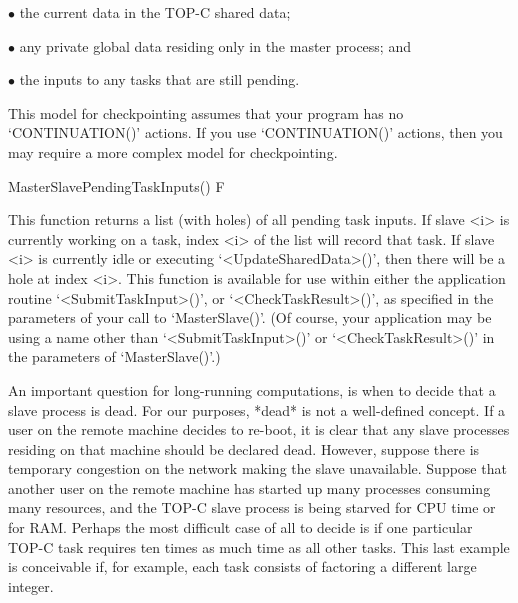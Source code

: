 \beginlist%

\item{$\bullet$}
    the current data in the TOP-C shared data;

\item{$\bullet$}
    any private global data residing only in the master process; and

\item{$\bullet$}
    the inputs to any tasks that are still pending.

\endlist

This  model  for  checkpointing  assumes  that  your   program   has   no
`CONTINUATION()' actions. If you use `CONTINUATION()' actions,  then  you
may require a more complex model for checkpointing.

\>MasterSlavePendingTaskInputs() F

This function returns a {\GAP} list (with  holes)  of  all  pending  task
inputs. If slave <i> is currently working on a task,  index  <i>  of  the
list will record that task. If slave <i> is currently idle  or  executing
`<UpdateSharedData>()', then there will be a hole  at  index  <i>.  This
function is available for  use  within  either  the  application  routine
`<SubmitTaskInput>()',  or  `<CheckTaskResult>()',   as   specified   in   the
parameters of your call to `MasterSlave()'. (Of course, your  application
may be using a name other than `<SubmitTaskInput>()' or  `<CheckTaskResult>()'
in the parameters of `MasterSlave()'.)


An important question for long-running computations, is  when  to  decide
that a slave  process  is  dead.  For  our  purposes,  *dead*  is  not  a
well-defined concept. If a user on the remote machine decides to re-boot,
it is clear that any slave processes residing on that machine  should  be
declared dead. However, suppose there  is  temporary  congestion  on  the
network making the slave unavailable. Suppose that another  user  on  the
remote machine has started up many processes  consuming  many  resources,
and the TOP-C slave process is being starved for CPU  time  or  for  RAM.
Perhaps the most difficult case of all to decide  is  if  one  particular
TOP-C task requires ten times as much time as all other tasks. This  last
example is conceivable if, for example, each task consists of factoring a
different large integer.

